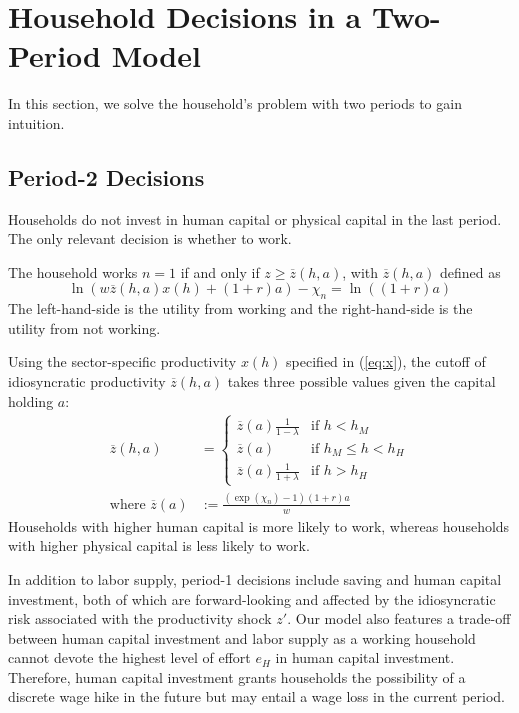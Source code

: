 \documentclass[12pt]{article}
\begin{document}
\section{Household Decisions in a Two-Period Model}
In this section, we solve the household's problem with two periods to gain intuition. 


\subsection{Period-2 Decisions}\label{sec:period2}
Households do not invest in human capital or physical capital in the last period. The only relevant decision is whether to work. 

The household works $n=1$ if and only if $z\geq\overline{z}(h,a)$, with $\overline{z}(h,a) $ defined as 
\begin{equation}
    \ln(w\overline{z}(h,a)x(h)+(1+r)a)-\chi_n = \ln((1+r)a)
\end{equation}
The left-hand-side is the utility from working and the right-hand-side is the utility from not working.

Using the sector-specific productivity $x(h)$ specified in (\ref{eq:x}), the cutoff of idiosyncratic productivity $\overline{z}(h,a)$ takes three possible values given the capital holding $a$:
\begin{align}
    \label{eq:z-period2}
\overline{z}(h,a)&=\left \{ 
\begin{array}{cl}
\overline{z}(a)\frac{1}{1-\lambda}  & \text{if }h<h_{M} \\ 
\overline{z}(a) & \text{if }h_{M} \leq h<h_{H} \\ 
\overline{z}(a)\frac{1}{1+\lambda}   & \text{if }h>h_{H}%
\end{array}%
\right. \\
\text{where }\overline{z}(a)&:=\frac{(\exp(\chi_n)-1)(1+r)a}{w}
\end{align}
Households with higher human capital is more likely to work, whereas households with higher physical capital is less likely to work. 

\bigskip
In addition to labor supply, period-1 decisions include saving and human capital investment, both of which are forward-looking and affected by the idiosyncratic risk associated with the productivity shock $z'$. 
Our model also features a trade-off between human capital investment and labor supply as a working household cannot devote the highest level of effort $e_H$ in human capital investment. Therefore, human capital investment grants households the possibility of a discrete wage hike in the future but may entail a wage loss in the current period. 
\end{document}
